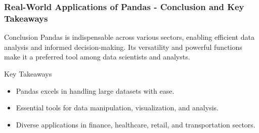 \documentclass{beamer}
\begin{document}
\begin{frame}[fragile]
    \frametitle{Real-World Applications of Pandas - Conclusion and Key Takeaways}
    \begin{block}{Conclusion}
        Pandas is indispensable across various sectors, enabling efficient data analysis and informed decision-making. Its versatility and powerful functions make it a preferred tool among data scientists and analysts.
    \end{block}
    
    \begin{block}{Key Takeaways}
        \begin{itemize}
            \item Pandas excels in handling large datasets with ease.
            \item Essential tools for data manipulation, visualization, and analysis.
            \item Diverse applications in finance, healthcare, retail, and transportation sectors.
        \end{itemize}
    \end{block}
\end{frame}
\end{document}
